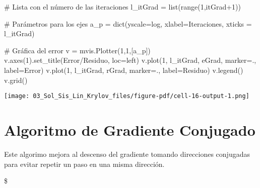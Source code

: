 \documentclass[
  letterpaper,
  DIV=11,
  numbers=noendperiod]{scrreprt}
\newenvironment{Shaded}{\begin{snugshade}}{\end{snugshade}}
\newcommand{\BuiltInTok}[1]{\textcolor[rgb]{0.00,0.23,0.31}{#1}}
\newcommand{\CommentTok}[1]{\textcolor[rgb]{0.37,0.37,0.37}{#1}}
\newcommand{\DecValTok}[1]{\textcolor[rgb]{0.68,0.00,0.00}{#1}}
\newcommand{\NormalTok}[1]{\textcolor[rgb]{0.00,0.23,0.31}{#1}}
\newcommand{\OperatorTok}[1]{\textcolor[rgb]{0.37,0.37,0.37}{#1}}
\newcommand{\StringTok}[1]{\textcolor[rgb]{0.13,0.47,0.30}{#1}}
\begin{document}
\begin{Shaded}
\begin{Highlighting}[]
\CommentTok{\# Lista con el número de las iteraciones}
\NormalTok{l\_itGrad }\OperatorTok{=} \BuiltInTok{list}\NormalTok{(}\BuiltInTok{range}\NormalTok{(}\DecValTok{1}\NormalTok{,itGrad}\OperatorTok{+}\DecValTok{1}\NormalTok{)) }

\CommentTok{\# Parámetros para los ejes}
\NormalTok{a\_p }\OperatorTok{=} \BuiltInTok{dict}\NormalTok{(yscale}\OperatorTok{=}\StringTok{\textquotesingle{}log\textquotesingle{}}\NormalTok{, xlabel}\OperatorTok{=}\StringTok{\textquotesingle{}Iteraciones\textquotesingle{}}\NormalTok{, xticks }\OperatorTok{=}\NormalTok{ l\_itGrad)}

\CommentTok{\# Gráfica del error}
\NormalTok{v }\OperatorTok{=}\NormalTok{ mvis.Plotter(}\DecValTok{1}\NormalTok{,}\DecValTok{1}\NormalTok{,[a\_p]) }
\NormalTok{v.axes(}\DecValTok{1}\NormalTok{).set\_title(}\StringTok{\textquotesingle{}Error/Residuo\textquotesingle{}}\NormalTok{, loc}\OperatorTok{=}\StringTok{\textquotesingle{}left\textquotesingle{}}\NormalTok{)}
\NormalTok{v.plot(}\DecValTok{1}\NormalTok{, l\_itGrad, eGrad, marker}\OperatorTok{=}\StringTok{\textquotesingle{}.\textquotesingle{}}\NormalTok{, label}\OperatorTok{=}\StringTok{\textquotesingle{}Error\textquotesingle{}}\NormalTok{)}
\NormalTok{v.plot(}\DecValTok{1}\NormalTok{, l\_itGrad, rGrad, marker}\OperatorTok{=}\StringTok{\textquotesingle{}.\textquotesingle{}}\NormalTok{, label}\OperatorTok{=}\StringTok{\textquotesingle{}Residuo\textquotesingle{}}\NormalTok{)}
\NormalTok{v.legend()}
\NormalTok{v.grid()}
\end{Highlighting}
\end{Shaded}

\texttt{[image: 03\_Sol\_Sis\_Lin\_Krylov\_files/figure-pdf/cell-16-output-1.png]}

\section{Algoritmo de Gradiente
Conjugado}\label{algoritmo-de-gradiente-conjugado}

Este algorimo mejora al descenso del gradiente tomando direcciones
conjugadas para evitar repetir un paso en una misma dirección.

\$
\end{document}
